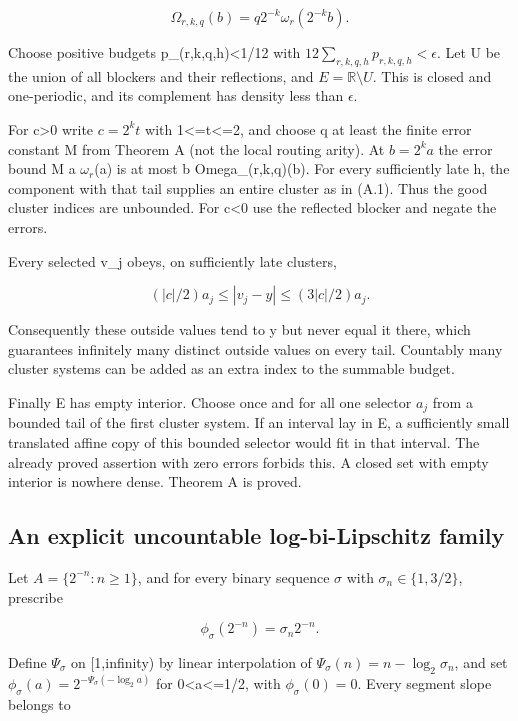 \documentclass[
  11pt,
]{article}
\theoremstyle{remark}\newtheorem{remark}[theorem]{Remark}
\begin{document}
\[
\Omega_{r,k,q}(b)=q2^{-k}\omega_r(2^{-k}b).
\]

Choose positive budgets p\_(r,k,q,h)\textless1/12 with
\(12\sum_{r,k,q,h}p_{r,k,q,h}<\epsilon\). Let U be the union of all
blockers and their reflections, and \(E=\mathbb R\setminus U\). This is
closed and one-periodic, and its complement has density less than
\(\epsilon\).

For c\textgreater0 write \(c=2^kt\) with 1\textless=t\textless=2, and
choose q at least the finite error constant M from Theorem A (not the
local routing arity). At \(b=2^ka\) the error bound M a \(\omega_r\)(a)
is at most b Omega\_(r,k,q)(b). For every sufficiently late h, the
component with that tail supplies an entire cluster as in (A.1). Thus
the good cluster indices are unbounded. For c\textless0 use the
reflected blocker and negate the errors.

Every selected v\_j obeys, on sufficiently late clusters,

\[
(|c|/2)a_j\le |v_j-y|\le(3|c|/2)a_j.
\]

Consequently these outside values tend to y but never equal it there,
which guarantees infinitely many distinct outside values on every tail.
Countably many cluster systems can be added as an extra index to the
summable budget.

Finally E has empty interior. Choose once and for all one selector
\(a_j\) from a bounded tail of the first cluster system. If an interval
lay in E, a sufficiently small translated affine copy of this bounded
selector would fit in that interval. The already proved assertion with
zero errors forbids this. A closed set with empty interior is nowhere
dense. Theorem A is proved.

\subsection{An explicit uncountable log-bi-Lipschitz
family}\label{an-explicit-uncountable-log-bi-lipschitz-family}

Let \(A=\{2^{-n}:n\ge1\}\), and for every binary sequence \(\sigma\)
with \(\sigma_n\in\{1,3/2\}\), prescribe

\[
\phi_\sigma(2^{-n})=\sigma_n2^{-n}.
\]

Define \(\Psi_\sigma\) on {[}1,infinity) by linear interpolation of
\(\Psi_\sigma(n)=n-\log_2\sigma_n\), and set
\(\phi_\sigma(a)=2^{-\Psi_\sigma(-\log_2a)}\) for
0\textless a\textless=1/2, with \(\phi_\sigma(0)=0\). Every segment
slope belongs to
\end{document}
